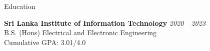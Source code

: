 \documentclass[
	11pt, %
]{./../assets/resume} %
\begin{document}
\begin{rSection}{Education}

	\textbf{Sri Lanka Institute of Information Technology} \hfill \textit{2020 - 2023} \\ 
	B.S. (Hons) Electrical and Electronic Engineering \\
	Cumulative  GPA: 3.01/4.0 \\
	
\end{rSection}

\end{document}
